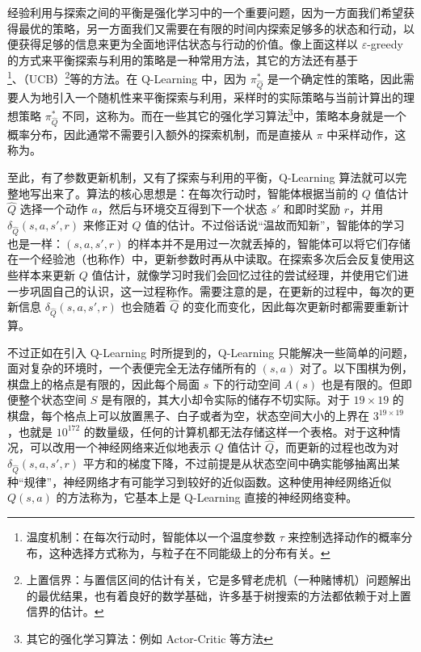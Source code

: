 经验利用与探索之间的平衡是强化学习中的一个重要问题，因为一方面我们希望获得最优的策略，另一方面我们又需要在有限的时间内探索足够多的状态和行动，以便获得足够的信息来更为全面地评估状态与行动的价值。像上面这样以 $\varepsilon$-greedy 的方式来平衡探索与利用的策略是一种常用方法，其它的方法还有基于\footnote{温度机制：在每次行动时，智能体以一个温度参数 $\tau$ 来控制选择动作的概率分布，这种选择方式称为，与粒子在不同能级上的分布有关。}、（UCB）\footnote{上置信界：与置信区间的估计有关，它是多臂老虎机（一种赌博机）问题解出的最优结果，也有着良好的数学基础，许多基于树搜索的方法都依赖于对上置信界的估计。}等的方法。在 Q-Learning 中，因为 $\pi^*_{\hat Q}$ 是一个确定性的策略，因此需要人为地引入一个随机性来平衡探索与利用，采样时的实际策略与当前计算出的理想策略 $\pi^*_{\hat Q}$ 不同，这称为。而在一些其它的强化学习算法\footnote{其它的强化学习算法：例如 Actor-Critic 等方法}中，策略本身就是一个概率分布，因此通常不需要引入额外的探索机制，而是直接从 $\pi$ 中采样动作，这称为。

至此，有了参数更新机制，又有了探索与利用的平衡，Q-Learning 算法就可以完整地写出来了。算法的核心思想是：在每次行动时，智能体根据当前的 $Q$ 值估计 $\hat Q$ 选择一个动作 $a$，然后与环境交互得到下一个状态 $s'$ 和即时奖励 $r$，并用 $\delta_{\hat Q} (s, a, s', r)$ 来修正对 $Q$ 值的估计。不过俗话说“温故而知新”，智能体的学习也是一样：$(s, a, s', r)$ 的样本并不是用过一次就丢掉的，智能体可以将它们存储在一个经验池（也称作）中，更新参数时再从中读取。在探索多次后会反复使用这些样本来更新 $Q$ 值估计，就像学习时我们会回忆过往的尝试经理，并使用它们进一步巩固自己的认识，这一过程称作。需要注意的是，在更新的过程中，每次的更新信息 $\delta_{\hat Q} (s, a, s', r)$ 也会随着 $\hat Q$ 的变化而变化，因此每次更新时都需要重新计算。

不过正如在引入 Q-Learning 时所提到的，Q-Learning 只能解决一些简单的问题，面对复杂的环境时，一个表便完全无法存储所有的 $(s, a)$ 对了。以下围棋为例，棋盘上的格点是有限的，因此每个局面 $s$ 下的行动空间 $A(s)$ 也是有限的。但即便整个状态空间 $S$ 是有限的，其大小却令实际的储存不切实际。对于 $19 \times 19$ 的棋盘，每个格点上可以放置黑子、白子或者为空，状态空间大小的上界在 $3^{19 \times 19}$，也就是 $10^{172}$ 的数量级，任何的计算机都无法存储这样一个表格。对于这种情况，可以改用一个神经网络来近似地表示 $Q$ 值估计 $\hat Q$，而更新的过程也改为对 $\delta_{\hat Q} (s, a, s', r)$ 平方和的梯度下降，不过前提是从状态空间中确实能够抽离出某种“规律”，神经网络才有可能学习到较好的近似函数。这种使用神经网络近似 $Q(s, a)$ 的方法称为，它基本上是 Q-Learning 直接的神经网络变种。

